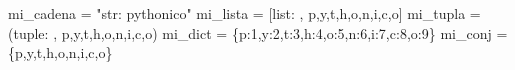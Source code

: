 \documentclass[
  spanish,
  letterpaper,
]{scrbook}
\newenvironment{Shaded}{\begin{snugshade}}{\end{snugshade}}
\newcommand{\DecValTok}[1]{\textcolor[rgb]{0.68,0.00,0.00}{#1}}
\newcommand{\NormalTok}[1]{\textcolor[rgb]{0.00,0.23,0.31}{#1}}
\newcommand{\OperatorTok}[1]{\textcolor[rgb]{0.37,0.37,0.37}{#1}}
\newcommand{\StringTok}[1]{\textcolor[rgb]{0.13,0.47,0.30}{#1}}
\theoremstyle{definition}
\theoremstyle{remark}
\begin{document}
\begin{Shaded}
\begin{Highlighting}[]
\NormalTok{mi\_cadena }\OperatorTok{=} \StringTok{"str: pythonico"}
\NormalTok{mi\_lista }\OperatorTok{=}\NormalTok{ [}\StringTok{\textquotesingle{}list: \textquotesingle{}}\NormalTok{, }\StringTok{\textquotesingle{}p\textquotesingle{}}\NormalTok{,}\StringTok{\textquotesingle{}y\textquotesingle{}}\NormalTok{,}\StringTok{\textquotesingle{}t\textquotesingle{}}\NormalTok{,}\StringTok{\textquotesingle{}h\textquotesingle{}}\NormalTok{,}\StringTok{\textquotesingle{}o\textquotesingle{}}\NormalTok{,}\StringTok{\textquotesingle{}n\textquotesingle{}}\NormalTok{,}\StringTok{\textquotesingle{}i\textquotesingle{}}\NormalTok{,}\StringTok{\textquotesingle{}c\textquotesingle{}}\NormalTok{,}\StringTok{\textquotesingle{}o\textquotesingle{}}\NormalTok{]}
\NormalTok{mi\_tupla }\OperatorTok{=}\NormalTok{ (}\StringTok{\textquotesingle{}tuple: \textquotesingle{}}\NormalTok{, }\StringTok{\textquotesingle{}p\textquotesingle{}}\NormalTok{,}\StringTok{\textquotesingle{}y\textquotesingle{}}\NormalTok{,}\StringTok{\textquotesingle{}t\textquotesingle{}}\NormalTok{,}\StringTok{\textquotesingle{}h\textquotesingle{}}\NormalTok{,}\StringTok{\textquotesingle{}o\textquotesingle{}}\NormalTok{,}\StringTok{\textquotesingle{}n\textquotesingle{}}\NormalTok{,}\StringTok{\textquotesingle{}i\textquotesingle{}}\NormalTok{,}\StringTok{\textquotesingle{}c\textquotesingle{}}\NormalTok{,}\StringTok{\textquotesingle{}o\textquotesingle{}}\NormalTok{)}
\NormalTok{mi\_dict }\OperatorTok{=}\NormalTok{ \{}\StringTok{\textquotesingle{}p\textquotesingle{}}\NormalTok{:}\DecValTok{1}\NormalTok{,}\StringTok{\textquotesingle{}y\textquotesingle{}}\NormalTok{:}\DecValTok{2}\NormalTok{,}\StringTok{\textquotesingle{}t\textquotesingle{}}\NormalTok{:}\DecValTok{3}\NormalTok{,}\StringTok{\textquotesingle{}h\textquotesingle{}}\NormalTok{:}\DecValTok{4}\NormalTok{,}\StringTok{\textquotesingle{}o\textquotesingle{}}\NormalTok{:}\DecValTok{5}\NormalTok{,}\StringTok{\textquotesingle{}n\textquotesingle{}}\NormalTok{:}\DecValTok{6}\NormalTok{,}\StringTok{\textquotesingle{}i\textquotesingle{}}\NormalTok{:}\DecValTok{7}\NormalTok{,}\StringTok{\textquotesingle{}c\textquotesingle{}}\NormalTok{:}\DecValTok{8}\NormalTok{,}\StringTok{\textquotesingle{}o\textquotesingle{}}\NormalTok{:}\DecValTok{9}\NormalTok{\}}
\NormalTok{mi\_conj }\OperatorTok{=}\NormalTok{ \{}\StringTok{\textquotesingle{}p\textquotesingle{}}\NormalTok{,}\StringTok{\textquotesingle{}y\textquotesingle{}}\NormalTok{,}\StringTok{\textquotesingle{}t\textquotesingle{}}\NormalTok{,}\StringTok{\textquotesingle{}h\textquotesingle{}}\NormalTok{,}\StringTok{\textquotesingle{}o\textquotesingle{}}\NormalTok{,}\StringTok{\textquotesingle{}n\textquotesingle{}}\NormalTok{,}\StringTok{\textquotesingle{}i\textquotesingle{}}\NormalTok{,}\StringTok{\textquotesingle{}c\textquotesingle{}}\NormalTok{,}\StringTok{\textquotesingle{}o\textquotesingle{}}\NormalTok{\}}
\end{Highlighting}
\end{Shaded}
\end{document}
